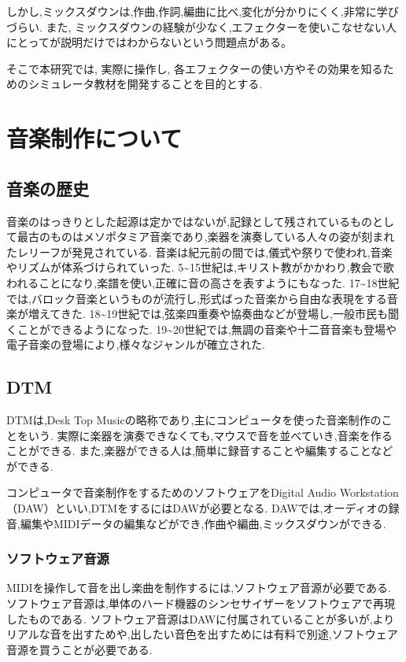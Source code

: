 \documentclass[12pt,a4j,titlepage]{ltjsarticle}
\begin{document}
しかし,ミックスダウンは,作曲,作詞,編曲に比べ,変化が分かりにくく,非常に学びづらい.
また, ミックスダウンの経験が少なく,エフェクターを使いこなせない人にとってが説明だけではわからないという問題点がある。

そこで本研究では, 実際に操作し, 各エフェクターの使い方やその効果を知るためのシミュレータ教材を開発することを目的とする.

\newpage
\section{音楽制作について}
\subsection{音楽の歴史}
音楽のはっきりとした起源は定かではないが,記録として残されているものとして最古のものはメソポタミア音楽であり,楽器を演奏している人々の姿が刻まれたレリーフが発見されている.
音楽は紀元前の間では,儀式や祭りで使われ,音楽やリズムが体系づけられていった.
5\sim15世紀は,キリスト教がかかわり,教会で歌われることになり,楽譜を使い,正確に音の高さを表すようにもなった.
17\sim18世紀では,バロック音楽というものが流行し,形式ばった音楽から自由な表現をする音楽が増えてきた.
18\sim19世紀では,弦楽四重奏や協奏曲などが登場し,一般市民も聞くことができるようになった.
19\sim20世紀では,無調の音楽や十二音音楽も登場や電子音楽の登場により,様々なジャンルが確立された\cite{history}.

\subsection{DTM}
DTMは,Desk Top Musicの略称であり,主にコンピュータを使った音楽制作のことをいう.
実際に楽器を演奏できなくても,マウスで音を並べていき,音楽を作ることができる.
また,楽器ができる人は,簡単に録音することや編集することなどができる\cite{dtm}.

コンピュータで音楽制作をするためのソフトウェアをDigital Audio Workstation（DAW）といい,DTMをするにはDAWが必要となる.
DAWでは,オーディオの録音,編集やMIDIデータの編集などができ,作曲や編曲,ミックスダウンができる\cite{daw}.

\subsubsection{ソフトウェア音源}
MIDIを操作して音を出し楽曲を制作するには,ソフトウェア音源が必要である.
ソフトウェア音源は,単体のハード機器のシンセサイザーをソフトウェアで再現したものである\cite{software}.
ソフトウェア音源はDAWに付属されていることが多いが,よりリアルな音を出すためや,出したい音色を出すためには有料で別途,ソフトウェア音源を買うことが必要である.
\end{document}

